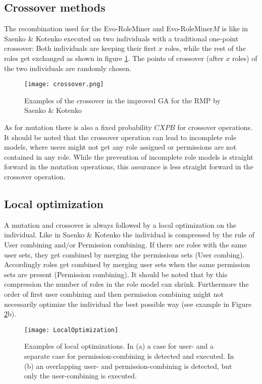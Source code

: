         \subsection{Crossover methods}
        The recombination used for the Evo-RoleMiner and Evo-RoleMiner$M$ is like in Saenko \& Kotenko\cite{saenko2012design} executed on two individuals with a traditional one-point crossover: Both individuals are keeping their first $x$ roles, while the rest of the roles get exchanged as shown in figure \ref{fig:crossover}. The points of crossover (after $x$ roles) of the two individuals are randomly chosen.
        
        \begin{figure}[H]
            \centering
            \texttt{[image: crossover.png]}
            \caption{Examples of the crossover in the improved GA for the RMP by Saenko \& Kotenko\cite{saenko2012design}}
            \label{fig:crossover}
        \end{figure}
        
        As for mutation there is also a fixed probability $CXPB$ for crossover operations. It should be noted that the crossover operation can lead to incomplete role models, where users might not get any role assigned or permissions are not contained in any role. While the prevention of incomplete role models is straight forward in the mutation operations, this assurance is less straight forward in the crossover operation.
        
        \subsection{Local optimization}
        \label{sec:localOptimization}
        A mutation and crossover is always followed by a local optimization on the individual. Like in Saenko \& Kotenko\cite{saenko2012design} the individual is compressed by the rule of User combining and/or Permission combining. If there are roles with the same user sets, they get combined by merging the permissions sets (User combing). Accordingly roles get combined by merging user sets when the same permission sets are present (Permission combining). It should be noted that by this compression the number of roles in the role model can shrink. Furthermore the order of first user combining and then permission combining might not necessarily optimize the individual the best possible way (see example in Figure \ref{fig:localOptimization}b).
        
        \begin{figure}[H]
            \centering
            \texttt{[image: LocalOptimization]}
            \caption{Examples of local optimizations. In (a) a case for user- and a separate case for permission-combining is detected and executed. In (b) an overlapping user- and permission-combining is detected, but only the user-combining is executed.}
            \label{fig:localOptimization}
        \end{figure}
        

